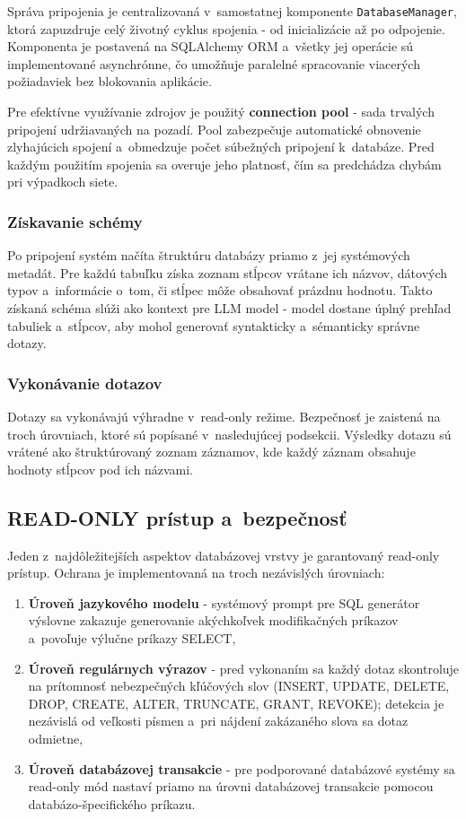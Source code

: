 \documentclass[a4paper, 12pt]{article}
\begin{document}
Správa pripojenia je centralizovaná v~samostatnej komponente \texttt{DatabaseManager}, ktorá zapuzdruje celý životný cyklus spojenia - od inicializácie až po odpojenie. Komponenta je postavená na SQLAlchemy ORM a~všetky jej operácie sú implementované asynchrónne, čo umožňuje paralelné spracovanie viacerých požiadaviek bez blokovania aplikácie.

Pre efektívne využívanie zdrojov je použitý \textbf{connection pool} - sada trvalých pripojení udržiavaných na pozadí. Pool zabezpečuje automatické obnovenie zlyhajúcich spojení a~obmedzuje počet súbežných pripojení k~databáze. Pred každým použitím spojenia sa overuje jeho platnosť, čím sa predchádza chybám pri výpadkoch siete.

\subsubsection{Získavanie schémy}

Po pripojení systém načíta štruktúru databázy priamo z~jej systémových metadát. Pre každú tabuľku získa zoznam stĺpcov vrátane ich názvov, dátových typov a~informácie o~tom, či stĺpec môže obsahovať prázdnu hodnotu. Takto získaná schéma slúži ako kontext pre LLM model - model dostane úplný prehľad tabuliek a~stĺpcov, aby mohol generovať syntakticky a~sémanticky správne dotazy.

\subsubsection{Vykonávanie dotazov}

Dotazy sa vykonávajú výhradne v~read-only režime. Bezpečnosť je zaistená na troch úrovniach, ktoré sú popísané v~nasledujúcej podsekcii. Výsledky dotazu sú vrátené ako štruktúrovaný zoznam záznamov, kde každý záznam obsahuje hodnoty stĺpcov pod ich názvami.

\subsection{READ-ONLY prístup a~bezpečnosť}

Jeden z~najdôležitejších aspektov databázovej vrstvy je garantovaný read-only prístup. Ochrana je implementovaná na troch nezávislých úrovniach:

\begin{enumerate}
    \item \textbf{Úroveň jazykového modelu} - systémový prompt pre SQL generátor výslovne zakazuje generovanie akýchkoľvek modifikačných príkazov a~povoľuje výlučne príkazy SELECT,
    \item \textbf{Úroveň regulárnych výrazov} - pred vykonaním sa každý dotaz skontroluje na prítomnosť nebezpečných kľúčových slov (INSERT, UPDATE, DELETE, DROP, CREATE, ALTER, TRUNCATE, GRANT, REVOKE); detekcia je nezávislá od veľkosti písmen a~pri nájdení zakázaného slova sa dotaz odmietne,
    \item \textbf{Úroveň databázovej transakcie} - pre podporované databázové systémy sa read-only mód nastaví priamo na úrovni databázovej transakcie pomocou databázo-špecifického príkazu.
\end{enumerate}
\end{document}
